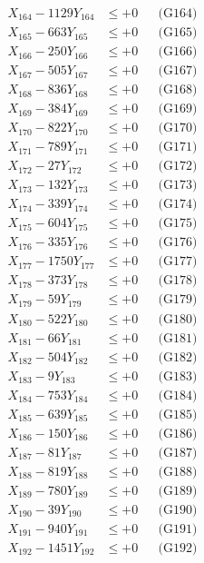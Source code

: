 \documentclass[a4paper,10pt]{article}
\begin{document}
{\begin{align}
X_{164} - 1129Y_{164} &\leq +0 && \text{(G164)} \\
X_{165} - 663Y_{165} &\leq +0 && \text{(G165)} \\
X_{166} - 250Y_{166} &\leq +0 && \text{(G166)} \\
X_{167} - 505Y_{167} &\leq +0 && \text{(G167)} \\
X_{168} - 836Y_{168} &\leq +0 && \text{(G168)} \\
X_{169} - 384Y_{169} &\leq +0 && \text{(G169)} \\
X_{170} - 822Y_{170} &\leq +0 && \text{(G170)} \\
\allowbreak
X_{171} - 789Y_{171} &\leq +0 && \text{(G171)} \\
X_{172} - 27Y_{172} &\leq +0 && \text{(G172)} \\
X_{173} - 132Y_{173} &\leq +0 && \text{(G173)} \\
X_{174} - 339Y_{174} &\leq +0 && \text{(G174)} \\
X_{175} - 604Y_{175} &\leq +0 && \text{(G175)} \\
X_{176} - 335Y_{176} &\leq +0 && \text{(G176)} \\
X_{177} - 1750Y_{177} &\leq +0 && \text{(G177)} \\
X_{178} - 373Y_{178} &\leq +0 && \text{(G178)} \\
X_{179} - 59Y_{179} &\leq +0 && \text{(G179)} \\
X_{180} - 522Y_{180} &\leq +0 && \text{(G180)} \\
\allowbreak
X_{181} - 66Y_{181} &\leq +0 && \text{(G181)} \\
X_{182} - 504Y_{182} &\leq +0 && \text{(G182)} \\
X_{183} - 9Y_{183} &\leq +0 && \text{(G183)} \\
X_{184} - 753Y_{184} &\leq +0 && \text{(G184)} \\
X_{185} - 639Y_{185} &\leq +0 && \text{(G185)} \\
X_{186} - 150Y_{186} &\leq +0 && \text{(G186)} \\
X_{187} - 81Y_{187} &\leq +0 && \text{(G187)} \\
X_{188} - 819Y_{188} &\leq +0 && \text{(G188)} \\
X_{189} - 780Y_{189} &\leq +0 && \text{(G189)} \\
X_{190} - 39Y_{190} &\leq +0 && \text{(G190)} \\
\allowbreak
X_{191} - 940Y_{191} &\leq +0 && \text{(G191)} \\
X_{192} - 1451Y_{192} &\leq +0 && \text{(G192)} \\

\end{align}}
\end{document}
